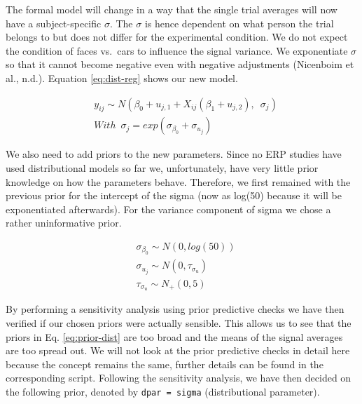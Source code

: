 \documentclass[
  doc,12pt,floatsintext]{apa7}
\begin{document}
The formal model will change in a way that the single trial averages will now have a subject-specific \(\sigma\). The \(\sigma\) is hence dependent on what person the trial belongs to but does not differ for the experimental condition. We do not expect the condition of faces vs.~cars to influence the signal variance. We exponentiate \(\sigma\) so that it cannot become negative even with negative adjustments (Nicenboim et al., n.d.). Equation \eqref{eq:dist-reg} shows our new model.

\begin{equation}
\begin{split}
& y_{ij} \sim N(\beta_0 + u_{j,1} + X_{ij}(\beta_1 + u_{j,2}), \enspace \sigma_j) \\
& With \enspace \sigma_j = exp(\sigma_{\beta_0} + \sigma_{u_j})
\end{split}
\label{eq:dist-reg}
\end{equation}

We also need to add priors to the new parameters. Since no ERP studies have used distributional models so far we, unfortunately, have very little prior knowledge on how the parameters behave. Therefore, we first remained with the previous prior for the intercept of the sigma (now as log(50) because it will be exponentiated afterwards). For the variance component of sigma we chose a rather uninformative prior.

\begin{equation}
\begin{split}
& \sigma_{\beta_0} \sim N(0, log(50)) \\
& \sigma_{u_j} \sim N(0, \tau_{\sigma_u}) \\
& \tau_{\sigma_u} \sim N_{+}(0,5)
\end{split}
\label{eq:prior-dist}
\end{equation}

By performing a sensitivity analysis using prior predictive checks we have then verified if our chosen priors were actually sensible. This allows us to see that the priors in Eq. \eqref{eq:prior-dist} are too broad and the means of the signal averages are too spread out. We will not look at the prior predictive checks in detail here because the concept remains the same, further details can be found in the corresponding script. Following the sensitivity analysis, we have then decided on the following prior, denoted by \texttt{dpar\ =\ sigma} (distributional parameter).
\end{document}
